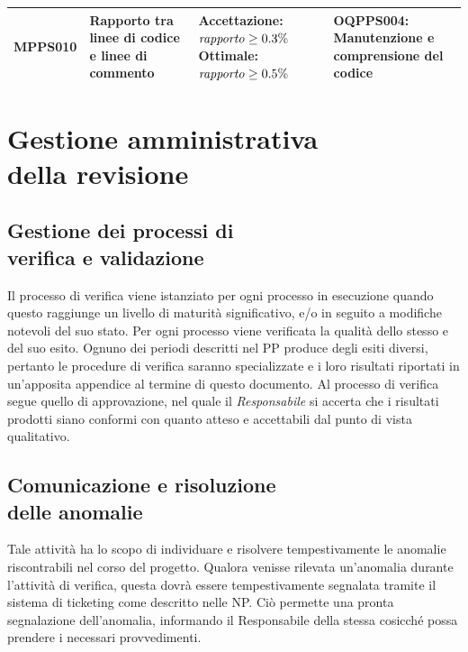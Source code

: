 \documentclass[openany,12pt,a4paper]{report}
\begin{document}
\begin{longtable}{| p{2cm} | p{3.5cm} |p{5.5cm} | p{5.5cm} |}
		\hline
		
		\newline MPPS010 &
		\newline Rapporto tra linee di codice e linee di commento &
		\newline \textbf{Accettazione:} \newline $ \textrm{\textit{rapporto}} \geq 0.3\% $
		\newline \textbf{Ottimale:} $ \textrm{\textit{rapporto}} \geq 0.5\% $ &
		\newline OQPPS004: Manutenzione e comprensione del codice 
		\\[1em]
		
		\hline
	\end{longtable}
	
\chapter{Gestione amministrativa \\ della revisione}
	
	\section{Gestione dei processi di \\ verifica e validazione}
	
	Il processo di verifica viene istanziato per ogni processo in esecuzione quando questo raggiunge un livello di maturità significativo, e/o in seguito a modifiche notevoli del suo stato. Per ogni processo viene verificata la qualità dello stesso e del suo esito. 
	Ognuno dei periodi descritti nel PP produce degli esiti diversi, pertanto le procedure di verifica saranno specializzate e i loro risultati riportati in un'apposita appendice al termine di questo documento. 
	Al processo di verifica segue quello di approvazione, nel quale il \textit{Responsabile} si accerta che i risultati prodotti siano conformi con quanto atteso e accettabili dal punto di vista qualitativo.
	
	\section{Comunicazione e risoluzione \\ delle anomalie}
	Tale attività ha lo scopo di individuare e risolvere tempestivamente le anomalie riscontrabili nel corso del progetto. Qualora venisse rilevata un'anomalia durante l'attività di verifica, questa dovrà essere tempestivamente segnalata tramite il sistema di ticketing come descritto nelle NP. Ciò permette una pronta segnalazione dell'anomalia, informando il Responsabile della stessa cosicché possa prendere i necessari provvedimenti.
\appendix
\end{document}

